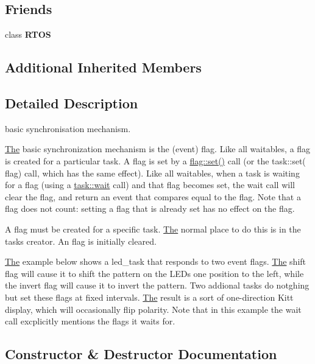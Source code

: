\subsection*{Friends}
\begin{DoxyCompactItemize}
\item 
class {\bfseries R\+T\+OS}\hypertarget{class_r_t_o_s_1_1flag_aa5b30b5b619f01a5d94b779bf0e58610}{}\label{class_r_t_o_s_1_1flag_aa5b30b5b619f01a5d94b779bf0e58610}

\end{DoxyCompactItemize}
\subsection*{Additional Inherited Members}


\subsection{Detailed Description}
basic synchronisation mechanism. 

\hyperlink{class_the}{The} basic synchronization mechanism is the (event) flag. Like all waitables, a flag is created for a particular task. A flag is set by a \hyperlink{class_r_t_o_s_1_1flag_aae862c6b7c385a4920d9a486e25ad5d8}{flag\+::set()} call (or the task\+::set( flag) call, which has the same effect). Like all waitables, when a task is waiting for a flag (using a \hyperlink{class_r_t_o_s_1_1task_a6fc603d0f1c8a94813586d3dfd123fcc}{task\+::wait} call) and that flag becomes set, the wait call will clear the flag, and return an event that compares equal to the flag. Note that a flag does not count\+: setting a flag that is already set has no effect on the flag.

A flag must be created for a specific task. \hyperlink{class_the}{The} normal place to do this is in the task\textquotesingle{}s creator. An flag is initially cleared.

\hyperlink{class_the}{The} example below shows a led\+\_\+task that responds to two event flags. \hyperlink{class_the}{The} shift flag will cause it to shift the pattern on the L\+E\+Ds one position to the left, while the invert flag will cause it to invert the pattern. Two addional tasks do notghing but set these flags at fixed intervals. \hyperlink{class_the}{The} result is a sort of one-\/direction Kitt display, which will occasionally flip polarity. Note that in this example the wait call excplicitly mentions the flags it waits for. 

\subsection{Constructor \& Destructor Documentation}
